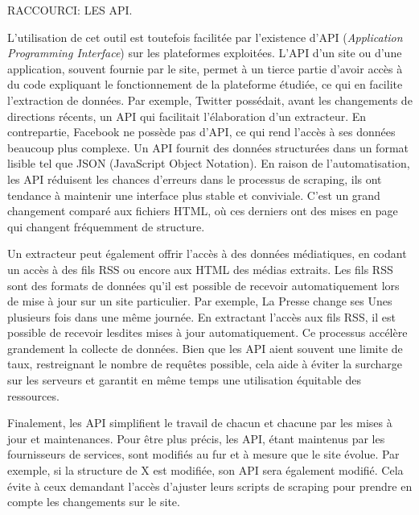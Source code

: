 \documentclass[
  letterpaper,
  DIV=11,
  numbers=noendperiod]{scrreprt}
\begin{document}
RACCOURCI: LES API.

L'utilisation de cet outil est toutefois facilitée par l'existence d'API
(\emph{Application Programming Interface}) sur les plateformes
exploitées. L'API d'un site ou d'une application, souvent fournie par le
site, permet à un tierce partie d'avoir accès à du code expliquant le
fonctionnement de la plateforme étudiée, ce qui en facilite l'extraction
de données. Par exemple, Twitter possédait, avant les changements de
directions récents, un API qui facilitait l'élaboration d'un extracteur.
En contrepartie, Facebook ne possède pas d'API, ce qui rend l'accès à
ses données beaucoup plus complexe. Un API fournit des données
structurées dans un format lisible tel que JSON (JavaScript Object
Notation). En raison de l'automatisation, les API réduisent les chances
d'erreurs dans le processus de scraping, ils ont tendance à maintenir
une interface plus stable et conviviale. C'est un grand changement
comparé aux fichiers HTML, où ces derniers ont des mises en page qui
changent fréquemment de structure.

Un extracteur peut également offrir l'accès à des données médiatiques,
en codant un accès à des fils RSS ou encore aux HTML des médias
extraits. Les fils RSS sont des formats de données qu'il est possible de
recevoir automatiquement lors de mise à jour sur un site particulier.
Par exemple, La Presse change ses Unes plusieurs fois dans une même
journée. En extractant l'accès aux fils RSS, il est possible de recevoir
lesdites mises à jour automatiquement. Ce processus accélère grandement
la collecte de données. Bien que les API aient souvent une limite de
taux, restreignant le nombre de requêtes possible, cela aide à éviter la
surcharge sur les serveurs et garantit en même temps une utilisation
équitable des ressources.

Finalement, les API simplifient le travail de chacun et chacune par les
mises à jour et maintenances. Pour être plus précis, les API, étant
maintenus par les fournisseurs de services, sont modifiés au fur et à
mesure que le site évolue. Par exemple, si la structure de X est
modifiée, son API sera également modifié. Cela évite à ceux demandant
l'accès d'ajuster leurs scripts de scraping pour prendre en compte les
changements sur le site.
\end{document}
